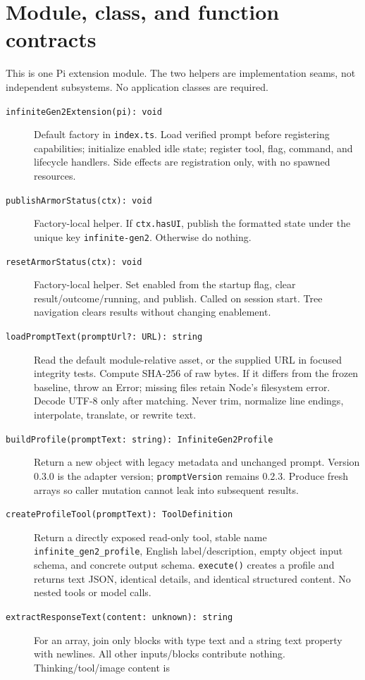 \documentclass[10pt]{ltjsarticle}
\begin{document}
\section{Module, class, and function contracts}
This is one Pi extension module. The two helpers are implementation seams,
not independent subsystems. No application classes are required.
\begin{description}
\item[\texttt{infiniteGen2Extension(pi): void}] Default factory in
\texttt{index.ts}. Load verified prompt before registering capabilities;
initialize enabled idle state; register tool, flag, command, and lifecycle
handlers. Side effects are registration only, with no spawned resources.
\item[\texttt{publishArmorStatus(ctx): void}] Factory-local helper. If
\texttt{ctx.hasUI}, publish the formatted state under the unique key
\texttt{infinite-gen2}. Otherwise do nothing.
\item[\texttt{resetArmorStatus(ctx): void}] Factory-local helper. Set enabled
from the startup flag, clear result/outcome/running, and publish. Called on
session start. Tree navigation clears results without changing enablement.
\item[\texttt{loadPromptText(promptUrl?: URL): string}] Read the default
module-relative asset, or the supplied URL in focused integrity tests. Compute
SHA-256 of raw bytes. If it differs from the frozen baseline, throw an Error;
missing files retain Node's filesystem error. Decode UTF-8 only after matching.
Never trim, normalize line endings, interpolate, translate, or rewrite text.
\item[\texttt{buildProfile(promptText: string): InfiniteGen2Profile}] Return a
new object with legacy metadata and unchanged prompt. Version 0.3.0 is the
adapter version; \texttt{promptVersion} remains 0.2.3. Produce fresh arrays so
caller mutation cannot leak into subsequent results.
\item[\texttt{createProfileTool(promptText): ToolDefinition}] Return a directly
exposed read-only tool, stable name \texttt{infinite\_gen2\_profile}, English
label/description, empty object input schema, and concrete output schema.
\texttt{execute()} creates a profile and returns text JSON, identical details,
and identical structured content. No nested tools or model calls.
\item[\texttt{extractResponseText(content: unknown): string}] For an array,
join only blocks with type text and a string text property with newlines.
All other inputs/blocks contribute nothing. Thinking/tool/image content is

\end{description}
\end{document}
